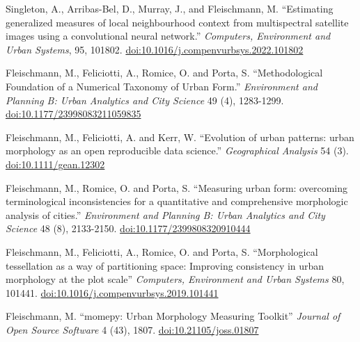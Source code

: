 \documentclass[11pt,a4paper]{report}
\begin{document}
\begin{tablist}

        \item[2022] \tab{}Singleton, A., Arribas-Bel, D., Murray, J., and Fleischmann, M. \enquote{Estimating generalized measures of local neighbourhood context from multispectral satellite images using a convolutional neural network.} \textit{Computers, Environment and Urban Systems}, 95, 101802. \href{https://doi.org/10.1016/j.compenvurbsys.2022.101802}{doi:10.1016/j.compenvurbsys.2022.101802}

        \item[2021] \tab{}Fleischmann, M., Feliciotti, A., Romice, O. and Porta, S. \enquote{Methodological Foundation of a Numerical Taxonomy of Urban Form.} \textit{Environment and Planning B: Urban Analytics and City Science} 49 (4), 1283-1299. \href{https://doi.org/10.1177/23998083211059835}{doi:10.1177/23998083211059835}

        \item[2021] \tab{}Fleischmann, M., Feliciotti, A. and Kerr, W. \enquote{Evolution of urban patterns: urban morphology as an open reproducible data science.} \textit{Geographical Analysis} 54 (3). \href{https://doi.org/10.1111/gean.12302}{doi:10.1111/gean.12302}


        \item[2020] \tab{}Fleischmann, M., Romice, O. and Porta, S. \enquote{Measuring urban form: overcoming terminological inconsistencies for a quantitative and comprehensive morphologic analysis of cities.} \textit{Environment and Planning B: Urban Analytics and City Science} 48 (8), 2133-2150. \href{https://doi.org/10.1177/2399808320910444}{doi:10.1177/2399808320910444}

        \item[2020] \tab{}Fleischmann, M., Feliciotti, A., Romice, O. and Porta, S. \enquote{Morphological tessellation as a way of partitioning space: Improving consistency in urban morphology at the plot scale} \textit{Computers, Environment and Urban Systems} 80, 101441. \href{https://doi.org/10.1016/j.compenvurbsys.2019.101441}{doi:10.1016/j.compenvurbsys.2019.101441}

        \item[2019] \tab{}Fleischmann, M. \enquote{momepy: Urban Morphology Measuring Toolkit} \textit{Journal of Open Source Software} 4 (43), 1807. \href{https://doi.org/10.21105/joss.01807}{doi:10.21105/joss.01807}


    \end{tablist}
\end{document}
